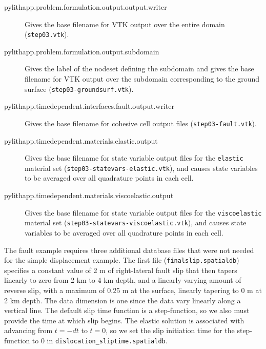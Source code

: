 \begin{description}
\item [{pylithapp.problem.formulation.output.output.writer}] Gives the
base filename for VTK output over the entire domain (\texttt{step03.vtk}).
\item [{pylithapp.problem.formulation.output.subdomain}] Gives the label
of the nodeset defining the subdomain and gives the base filename
for VTK output over the subdomain corresponding to the ground surface
\linebreak{}
(\texttt{step03-groundsurf.vtk}).
\item [{pylithapp.timedependent.interfaces.fault.output.writer}] Gives
the base filename for cohesive cell output files \linebreak{}
(\texttt{step03-fault.vtk}).
\item [{pylithapp.timedependent.materials.elastic.output}] Gives the base
filename for state variable output files for the \texttt{elastic}
material set (\texttt{step03-statevars-elastic.vtk}), and causes state
variables to be averaged over all quadrature points in each cell.
\item [{pylithapp.timedependent.materials.viscoelastic.output}] Gives the
base filename for state variable output files for the \texttt{viscoelastic}
material set (\texttt{step03-statevars-viscoelastic.vtk}), and causes
state variables to be averaged over all quadrature points in each
cell.
\end{description}
The fault example requires three additional database files that were
not needed for the simple displacement example. The first file (\texttt{finalslip.spatialdb})
specifies a constant value of 2 m of right-lateral fault slip that
then tapers linearly to zero from 2 km to 4 km depth, and a linearly-varying
amount of reverse slip, with a maximum of 0.25 m at the surface, linearly
tapering to 0 m at 2 km depth. The data dimension is one since the
data vary linearly along a vertical line. The default slip time function
is a step-function, so we also must provide the time at which slip
begins. The elastic solution is associated with advancing from $t=-dt$
to $t=0$, so we set the slip initiation time for the step-function
to 0 in \texttt{dislocation\_sliptime.spatialdb}.

